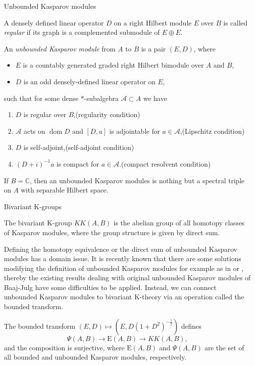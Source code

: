 \documentclass[handout]{../../../slide}
\begin{document}
\begin{frame}{Unbounded Kasparov modules}
\begin{defn}
A densely defined linear operator $D$ on a right Hilbert module $E$ over $B$ is called \emph{regular} if its graph is a complemented submodule of $E\oplus E$.
\end{defn}
\pause
\begin{defn}
An \emph{unbounded Kasparov module} from $A$ to $B$ is a pair $(E,D)$, where
\begin{itemize}
\item $E$ is a countably generated graded right Hilbert bimodule over $A$ and $B$,
\item $D$ is an odd densely-defined linear operator on $E$,
\end{itemize}
such that for some dense $*$-subalgebra $\mathcal{A}\subset A$ we have
\begin{enumerate}
\item $D$ is regular over $B$,\hfill(regularity condition)
\item $\mathcal{A}$ acts on $\operatorname{dom}D$ and $[D,a]$ is adjointable for $a\in\mathcal{A}$,\hfill(Lipschitz condition)
\item $D$ is self-adjoint,\hfill(self-adjoint condition)
\item $(D+i)^{-1}a$ is compact for $a\in\mathcal{A}$.\hfill(compact resolvent condition)
\end{enumerate}
\end{defn}
\pause
If $B=\mathbb{C}$, then an unbounded Kasparov modules is nothing but a spectral triple on $A$ with separable Hilbert space.
\end{frame}




\begin{frame}{Bivariant K-groups}
\begin{defn}
The bivariant K-group $KK(A,B)$ is the abelian group of all homotopy classes of Kasparov modules, where the group structure is given by direct sum.
\end{defn}
\pause
Defining the homotopy equivalence or the direct sum of unbounded Kasparov modules has a domain issue.
It is recently known that there are some solutions modifying the definition of unbounded Kasparov modules for example as in \cite{MR4132745} or \cite{MR4137615}, thereby the existing results dealing with original unbounded Kasparov modules of Baaj-Julg have some difficulties to be applied.
Instead, we can connect unbounded Kasparov modules to bivariant K-theory via an operation called the bounded transform.
\pause
\begin{thm}[\cite{MR715325}]
The bounded transform $(E,D)\mapsto(E,D(1+D^2)^{-\frac12})$ defines
\[\Psi(A,B)\to\mathrm{E}(A,B)\to KK(A,B),\]
and the composition is surjective, where $\mathrm{E}(A,B)$ and $\Psi(A,B)$ are the set of all bounded and unbounded Kasparov modules, respectively.
\end{thm}
\end{frame}
\end{document}

